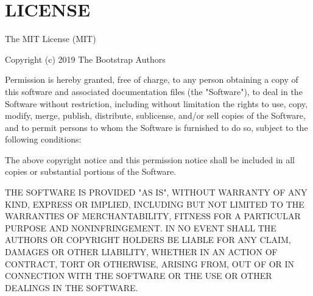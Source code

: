 \chapter{LICENSE}
\hypertarget{md_public_2_muse_2assets_2vendor_2bootstrap-icons_2_l_i_c_e_n_s_e}{}\label{md_public_2_muse_2assets_2vendor_2bootstrap-icons_2_l_i_c_e_n_s_e}
The MIT License (MIT)

Copyright (c) 2019 The Bootstrap Authors

Permission is hereby granted, free of charge, to any person obtaining a copy of this software and associated documentation files (the "{}\+Software"{}), to deal in the Software without restriction, including without limitation the rights to use, copy, modify, merge, publish, distribute, sublicense, and/or sell copies of the Software, and to permit persons to whom the Software is furnished to do so, subject to the following conditions\+:

The above copyright notice and this permission notice shall be included in all copies or substantial portions of the Software.

THE SOFTWARE IS PROVIDED "{}\+AS IS"{}, WITHOUT WARRANTY OF ANY KIND, EXPRESS OR IMPLIED, INCLUDING BUT NOT LIMITED TO THE WARRANTIES OF MERCHANTABILITY, FITNESS FOR A PARTICULAR PURPOSE AND NONINFRINGEMENT. IN NO EVENT SHALL THE AUTHORS OR COPYRIGHT HOLDERS BE LIABLE FOR ANY CLAIM, DAMAGES OR OTHER LIABILITY, WHETHER IN AN ACTION OF CONTRACT, TORT OR OTHERWISE, ARISING FROM, OUT OF OR IN CONNECTION WITH THE SOFTWARE OR THE USE OR OTHER DEALINGS IN THE SOFTWARE. 